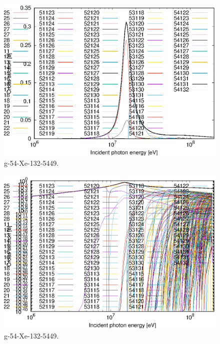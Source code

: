 \begin{figure}
 \includegraphics[width=\linewidth]{eps/g_54-Xe-132_5449.eps}
  \caption{g-54-Xe-132-5449.}
\end{figure}
\begin{figure}
 \includegraphics[width=\linewidth]{eps-log/g_54-Xe-132_5449.eps}
 \caption{g-54-Xe-132-5449.}
\end{figure}
\newpage \clearpage

